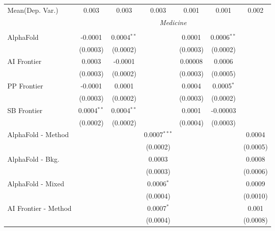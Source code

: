 \begin{tabular}{lcccccc}
Mean(Dep. Var.) & 0.003 & 0.003 & 0.003 & 0.001 & 0.001 & 0.002 \\
 & \multicolumn{6}{c}{\textit{Medicine}} \\ \\
   AlphaFold            & -0.0001       & 0.0004$^{**}$ &                & 0.0001   & 0.0006$^{**}$ &   \\   
                        & (0.0003)      & (0.0002)      &                & (0.0003) & (0.0002)      &   \\   
   AI Frontier          & 0.0003        & -0.0001       &                & 0.00008  & 0.0006        &   \\   
                        & (0.0003)      & (0.0002)      &                & (0.0003) & (0.0005)      &   \\   
   PP Frontier          & -0.0001       & 0.0001        &                & 0.0004   & 0.0005$^{*}$  &   \\   
                        & (0.0003)      & (0.0002)      &                & (0.0003) & (0.0002)      &   \\   
   SB Frontier          & 0.0004$^{**}$ & 0.0004$^{**}$ &                & 0.0001   & -0.00003      &   \\   
                        & (0.0002)      & (0.0002)      &                & (0.0004) & (0.0003)      &   \\   
   AlphaFold - Method   &               &               & 0.0007$^{***}$ &          &               & 0.0004\\   
                        &               &               & (0.0002)       &          &               & (0.0005)\\   
   AlphaFold - Bkg.     &               &               & 0.0003         &          &               & 0.0008\\   
                        &               &               & (0.0003)       &          &               & (0.0006)\\   
   AlphaFold - Mixed    &               &               & 0.0006$^{*}$   &          &               & 0.0009\\   
                        &               &               & (0.0004)       &          &               & (0.0010)\\   
   AI Frontier - Method &               &               & 0.0007$^{*}$   &          &               & 0.001\\   
                        &               &               & (0.0004)       &          &               & (0.0008)\\   

\end{tabular}
